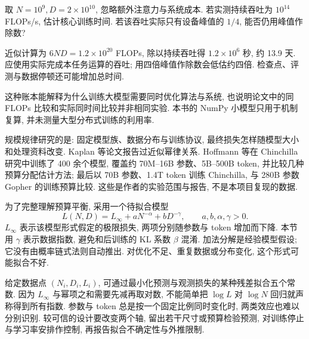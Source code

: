 \begin{example}
取 $N=10^9,D=2\times10^{10}$, 忽略额外注意力与系统成本. 若实测持续吞吐为 $10^{14}$ FLOPs/s, 估计核心训练时间. 若该吞吐实际只有设备峰值的 $1/4$, 能否仍用峰值作除数?
\end{example}
\begin{solution}
近似计算为 $6ND=1.2\times10^{20}$ FLOPs, 除以持续吞吐得 $1.2\times10^6$ 秒, 约 13.9 天. 应使用实际完成本任务运算的吞吐; 用四倍峰值作除数会低估约四倍. 检查点、评测与数据停顿还可能增加总时间.
\end{solution}
这种账本能解释为什么训练大模型需要同时优化算法与系统, 也说明论文中的同 FLOPs 比较和实际同时间比较并非相同实验. 本书的 NumPy 小模型只用于机制复算, 并未测量大型分布式训练的利用率.

\label{sec:progress-scaling}
规模规律研究的是: 固定模型族、数据分布与训练协议, 最终损失怎样随模型大小和处理资料改变. Kaplan 等论文报告过近似幂律关系\cite{kaplan}. Hoffmann 等在 Chinchilla 研究中训练了 400 余个模型, 覆盖约 70M--16B 参数、5B--500B token, 并比较几种预算分配估计方法; 最后以 70B 参数、1.4T token 训练 Chinchilla, 与 280B 参数 Gopher 的训练预算比较\cite{chinchilla}. 这些是作者的实验范围与报告, 不是本项目复现的数据.

为了完整理解预算平衡, 采用一个待拟合模型
\begin{equation}\label{eq:scaling-model}
L(N,D)=L_\infty+aN^{-\alpha}+bD^{-\gamma},
\qquad a,b,\alpha,\gamma>0.
\end{equation}
$L_\infty$ 表示该模型形式假定的极限损失, 两项分别随参数与 token 增加而下降. 本节用 $\gamma$ 表示数据指数, 避免和后训练的 KL 系数 $\beta$ 混淆. 加法分解是经验模型假设; 它没有由概率链式法则自动推出. 对优化不足、重复数据或分布变化, 这个形式可能拟合不好.

给定数据点 $(N_i,D_i,L_i)$, 可通过最小化预测与观测损失的某种残差拟合五个常数. 因为 $L_\infty$ 与幂项之和需要先减再取对数, 不能简单把 $\log L$ 对 $\log N$ 回归就声称得到所有指数. 参数与 token 总是按一个固定比例同时变化时, 两类效应也难以分别识别. 较可信的设计要改变两个轴, 留出若干尺寸或预算检验预测, 对训练停止与学习率安排作控制, 再报告拟合不确定性与外推限制.

